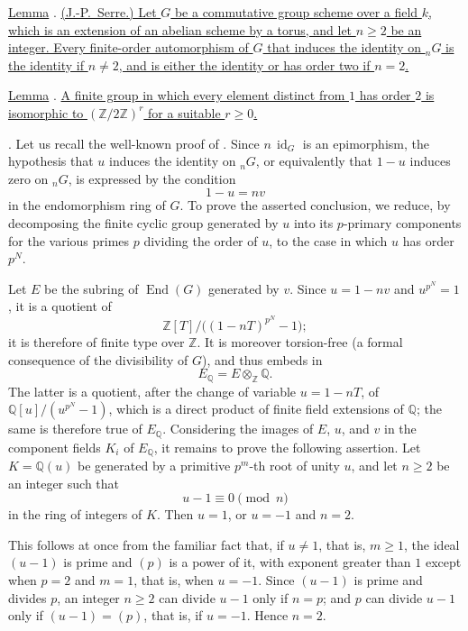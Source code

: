 \medskip
\noindent
\underline{Lemma} . \underline{(J.-P.\ Serre.)  Let $G$ be a
commutative group scheme over a field $k$, which is an extension of an
abelian scheme by a torus, and let $n\geq2$ be an integer.  Every
finite-order automorphism of $G$ that induces the identity on ${}_nG$ is
the identity if $n\neq2$, and is either the identity or has order two if
$n=2$.}

\medskip
\noindent
\underline{Lemma} . \underline{A finite group in which every
element distinct from $1$ has order $2$ is isomorphic to
$(\mathbb Z/2\mathbb Z)^r$ for a suitable $r\geq0$.}

\smallskip
\noindent
{}. Let us recall the well-known proof of .  Since
$n\,\operatorname{id}_G$ is an epimorphism, the hypothesis that $u$
induces the identity on ${}_nG$, or equivalently that $1-u$ induces zero
on ${}_nG$, is expressed by the condition
\[
 1-u=nv
\]
in the endomorphism ring of $G$.  To prove the asserted conclusion, we
reduce, by decomposing the finite cyclic group generated by $u$ into its
$p$-primary components for the various primes $p$ dividing the order of
$u$, to the case in which $u$ has order $p^N$.

Let $E$ be the subring of $\operatorname{End}(G)$ generated by $v$.
Since $u=1-nv$ and $u^{p^N}=1$, it is a quotient of
\[
 \mathbb Z[T]\big/\bigl((1-nT)^{p^N}-1\bigr);
\]
it is therefore of finite type over $\mathbb Z$.  It is moreover
torsion-free (a formal consequence of the divisibility of $G$), and thus
embeds in
\[
 E_{\mathbb Q}=E\otimes_{\mathbb Z}\mathbb Q.
\]
The latter is a quotient, after the change of variable $u=1-nT$, of
$\mathbb Q[u]/(u^{p^N}-1)$, which is a direct product of finite field
extensions of $\mathbb Q$; the same is therefore true of $E_{\mathbb Q}$.
Considering the images of $E$, $u$, and $v$ in the component fields
$K_i$ of $E_{\mathbb Q}$, it remains to prove the following assertion.
Let $K=\mathbb Q(u)$ be generated by a primitive $p^m$-th root of unity
$u$, and let $n\geq2$ be an integer such that
\[
 u-1\equiv0\pmod n
\]
in the ring of integers of $K$.  Then $u=1$, or $u=-1$ and $n=2$.

This follows at once from the familiar fact that, if $u\neq1$, that is,
$m\geq1$, the ideal $(u-1)$ is prime and $(p)$ is a power of it, with
exponent greater than $1$ except when $p=2$ and $m=1$, that is, when
$u=-1$.  Since $(u-1)$ is prime and divides $p$, an integer $n\geq2$ can
divide $u-1$ only if $n=p$; and $p$ can divide $u-1$ only if
$(u-1)=(p)$, that is, if $u=-1$.  Hence $n=2$.

